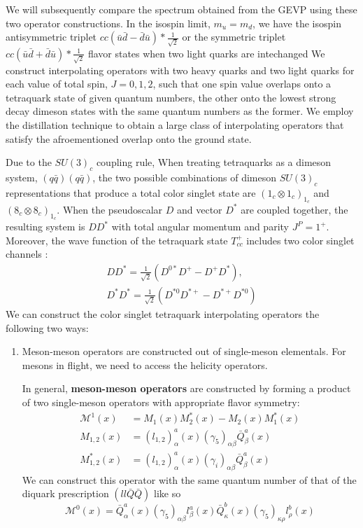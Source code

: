 \begin{table}
We will subsequently compare the spectrum obtained from the GEVP using these two operator constructions. 
In the isospin limit, $m_u = m_d$, we have the isospin antisymmetric triplet $cc(\bar{u}\bar{d} - \bar{d}\bar{u}) * \frac{1}{\sqrt{2}}$ or the symmetric triplet $cc(\bar{u}\bar{d} + \bar{d}\bar{u}) * \frac{1}{\sqrt{2}}$  flavor states when two light quarks are intechanged \cite{Pacheco_2023} We construct interpolating operators with two heavy quarks and two light quarks for each value of total spin, $J=0,1,2$, such that one spin value overlaps onto a tetraquark state of given quantum numbers, the other onto the lowest strong decay dimeson states with the same quantum numbers as the former. We employ the distillation technique to obtain a large class of interpolating operators that satisfy the afroementioned overlap onto the ground state. 

Due to the $SU(3)_c$ coupling rule, When treating tetraquarks as a dimeson system, $(q\bar{q})(q\bar{q})$, the two possible combinations of dimeson $SU(3)_c$ representations that produce a total color singlet state are $({1_c \otimes 1_c})_{1_c}$ and $({8_c \otimes 8_c})_{1_c}$. When the pseudoscalar $D$ and vector $D^*$ are coupled together, the resulting system is $DD^*$ with total angular momentum and parity $J^P = 1^+$. Moreover, the wave function of the tetraquark state $T_{cc}^+$ includes two color singlet channels :
\begin{align}
    DD^* = \frac{1}{\sqrt{2}}(D^{0*}D^+ - D^+D^*), \\
    D^*D^* = \frac{1}{\sqrt{2}}(D^{*0}D^{*+} - D^{*+}D^{*0})
\end{align} 
We can construct the color singlet tetraquark interpolating operators the following two ways:
\begin{enumerate}
    \item Meson-meson operators are constructed out of single-meson elementals. For mesons in flight, we need to access the helicity operators.  

    In general, \textbf{meson-meson operators} are constructed by forming a product of two single-meson operators with appropriate flavor symmetry: \cite{Junnarkar_2019}
    \begin{align}
    \mathcal{M}^1(x) &= M_1(x)M_2^*(x) - M_2(x)M_1^*(x) \\
    M_{1,2}(x) &= (l_{1,2})^a_\alpha(x) (\gamma_5)_{\alpha\beta} \bar{Q}^a_\beta(x) \\
    M_{1,2}^*(x) &= (l_{1,2})^a_\alpha(x) (\gamma_i)_{\alpha\beta} \bar{Q}^a_\beta(x) 
    \end{align}
    We can construct this operator with the same quantum number of that of the diquark prescription $(ll\bar{Q}\bar{Q})$ like so 
    \begin{equation}
    \mathcal{M}^0(x) = \bar{Q}_\alpha^a(x)(\gamma_5)_{\alpha\beta}l^a_\beta(x) \bar{Q}_\kappa^b(x)(\gamma_5)_{\kappa\rho}l^b_\rho(x)
    \end{equation}


\end{enumerate}
\end{table}

